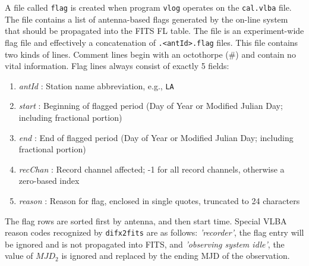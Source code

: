 A file called {\tt flag} is created when program {\tt vlog} operates on the {\tt cal.vlba} file.
The file contains a list of antenna-based flags generated by the on-line system that should be propagated into the FITS FL table.
The file is an experiment-wide flag file and effectively a concatenation of {\tt .{\textless}antId{\textgreater}.flag} files.
This file contains two kinds of lines.
Comment lines begin with an octothorpe (\#) and contain no vital information.
Flag lines always consist of exactly 5 fields:
\begin{enumerate}
\item {\em antId} : Station name abbreviation, e.g., {\tt LA}
\item {\em start} : Beginning of flagged period (Day of Year or Modified Julian Day; including fractional portion)
\item {\em end} : End of flagged period (Day of Year or Modified Julian Day; including fractional portion)
\item {\em recChan} : Record channel affected; -1 for all record channels, otherwise a zero-based index
\item {\em reason} : Reason for flag, enclosed in single quotes, truncated to 24 characters
\end{enumerate}
The flag rows are sorted first by antenna, and then start time.
Special VLBA reason codes recognized by {\tt difx2fits} are as follows: {\em 'recorder'}, the flag entry will be ignored and is not propagated into FITS, and {\em 'observing system idle'}, the value of $MJD_2$ is ignored and replaced by the ending MJD of the observation.


%
%







